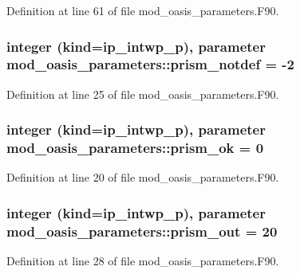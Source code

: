 Definition at line 61 of file mod\+\_\+oasis\+\_\+parameters.\+F90.

\hypertarget{classmod__oasis__parameters_aa388f517f0a947f770637d617bdda79b}{
\subsubsection[{prism\+\_\+notdef}]{\setlength{\rightskip}{0pt plus 5cm}integer (kind=ip\+\_\+intwp\+\_\+p), parameter mod\+\_\+oasis\+\_\+parameters\+::prism\+\_\+notdef = -\/2}}\label{classmod__oasis__parameters_aa388f517f0a947f770637d617bdda79b}


Definition at line 25 of file mod\+\_\+oasis\+\_\+parameters.\+F90.

\hypertarget{classmod__oasis__parameters_aa7cbeb1a099f571702827ace878cdc64}{
\subsubsection[{prism\+\_\+ok}]{\setlength{\rightskip}{0pt plus 5cm}integer (kind=ip\+\_\+intwp\+\_\+p), parameter mod\+\_\+oasis\+\_\+parameters\+::prism\+\_\+ok = 0}}\label{classmod__oasis__parameters_aa7cbeb1a099f571702827ace878cdc64}


Definition at line 20 of file mod\+\_\+oasis\+\_\+parameters.\+F90.

\hypertarget{classmod__oasis__parameters_a58d4e90d13e758e6a6dfab01e6a1415e}{
\subsubsection[{prism\+\_\+out}]{\setlength{\rightskip}{0pt plus 5cm}integer (kind=ip\+\_\+intwp\+\_\+p), parameter mod\+\_\+oasis\+\_\+parameters\+::prism\+\_\+out = 20}}\label{classmod__oasis__parameters_a58d4e90d13e758e6a6dfab01e6a1415e}


Definition at line 28 of file mod\+\_\+oasis\+\_\+parameters.\+F90.

